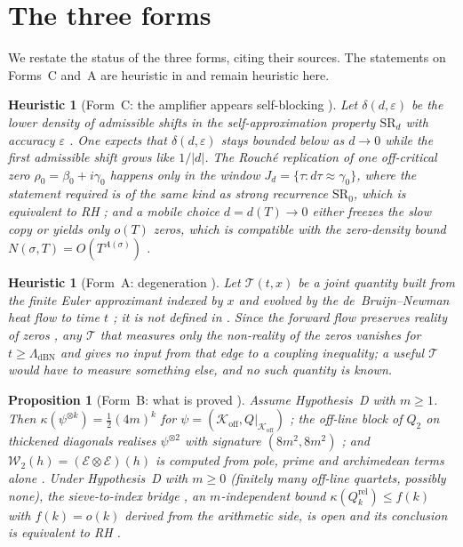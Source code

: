 \documentclass[11pt]{amsart}
\newtheorem{proposition}[theorem]{Proposition}
\newtheorem{heuristic}[theorem]{Heuristic}
\theoremstyle{definition}
\theoremstyle{remark}
\newcommand{\Koff}{\mathcal{K}_{\mathrm{off}}}
\newcommand{\Wtwo}{\mathcal{W}_2}
\newcommand{\LDBN}{\Lambda_{\mathrm{dBN}}}
\begin{document}
\section{The three forms}\label{sec:trichotomy}

We restate the status of the three forms, citing their sources. The
statements on Forms~C and~A are heuristic in \cite{P28} and remain heuristic
here.

\begin{heuristic}[Form~C: the amplifier appears self-blocking {\cite[Heuristics~2.1, 2.2]{P28}}]
\label{thm:C}
Let $\delta(d,\varepsilon)$ be the lower density of admissible shifts in the
self-approximation property $\mathrm{SR}_d$ with accuracy $\varepsilon$
\cite[\S8]{P27}. One expects that $\delta(d,\varepsilon)$ stays bounded below
as $d\to0$ while the first admissible shift grows like $1/|d|$. The
Rouch\'e replication of one off-critical zero $\rho_0=\beta_0+i\gamma_0$
happens only in the window $J_d=\{\tau:d\tau\approx\gamma_0\}$, where the
statement required is of the same kind as strong recurrence $\mathrm{SR}_0$,
which is equivalent to RH \cite{Bagchi}; and a mobile choice $d=d(T)\to0$
either freezes the slow copy or yields only $o(T)$ zeros, which is compatible
with the zero-density bound $N(\sigma,T)=O(T^{A(\sigma)})$ \cite[Ch.~IX]{bgTitchmarsh}.
\end{heuristic}

\begin{heuristic}[Form~A: degeneration {\cite[Heuristic~3.1]{P28}}]
\label{thm:A}
Let $\mathcal{T}(t,x)$ be a joint quantity built from the finite Euler
approximant indexed by $x$ and evolved by the de~Bruijn--Newman heat flow to
time $t$ \cite[Problem~6.1]{P27}; it is not defined in \cite{P27}. Since the
forward flow preserves reality of zeros \cite{deBruijn50}, any $\mathcal{T}$
that measures only the non-reality of the zeros vanishes for $t\ge\LDBN$ and
gives no input from that edge to a coupling inequality; a useful $\mathcal T$
would have to measure something else, and no such quantity is known.
\end{heuristic}

\begin{proposition}[Form~B: what is proved {\cite{P28}}]
\label{thm:B}
Assume Hypothesis~D with $m\ge1$. Then $\kappa(\psi^{\otimes k})=\tfrac12(4m)^k$
for $\psi=(\Koff,Q|_{\Koff})$ \cite[Thm~4.2]{P28}; the off-line block of
$Q_2$ on thickened diagonals realises $\psi^{\otimes2}$ with signature
$(8m^2,8m^2)$ \cite[Thm~5.1]{P28}; and $\Wtwo(h)=(\mathcal E\otimes\mathcal
E)(h)$ is computed from pole, prime and archimedean terms alone
\cite[Thms~5.3, 5.4]{P28}. Under Hypothesis~D with $m\ge0$ (finitely many
off-line quartets, possibly none), the sieve-to-index bridge
\cite[Missing Lemma~6.1]{P28}, an $m$-independent bound
$\kappa(Q_k^{\mathrm{rel}})\le f(k)$ with $f(k)=o(k)$ derived from the
arithmetic side, is open and its conclusion is equivalent to RH
\cite[\S6.1]{P28}.
\end{proposition}
\end{document}
